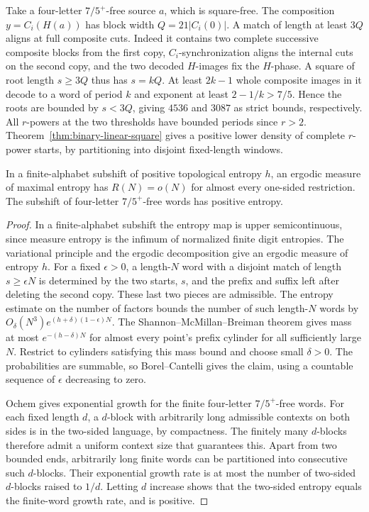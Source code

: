 Take a four-letter \(7/5^+\)-free source \(a\), which is square-free. The composition \(y=C_i(H(a))\) has block width \(Q=21|C_i(0)|\). A match of length at least \(3Q\) aligns at full composite cuts. Indeed it contains two complete successive composite blocks from the first copy, \(C_i\)-synchronization aligns the internal cuts on the second copy, and the two decoded \(H\)-images fix the \(H\)-phase. A square of root length \(s\ge3Q\) thus has \(s=kQ\). At least \(2k-1\) whole composite images in it decode to a word of period \(k\) and exponent at least \(2-1/k>7/5\). Hence the roots are bounded by \(s<3Q\), giving \(4536\) and \(3087\) as strict bounds, respectively. All \(r\)-powers at the two thresholds have bounded periods since \(r>2\). Theorem~\ref{thm:binary-linear-square} gives a positive lower density of complete \(r\)-power starts, by partitioning into disjoint fixed-length windows.

\begin{lemma}\label{lem:entropy-repetitions}
In a finite-alphabet subshift of positive topological entropy \(h\), an ergodic measure of maximal entropy has \(R(N)=o(N)\) for almost every one-sided restriction. The subshift of four-letter \(7/5^+\)-free words has positive entropy.
\end{lemma}
\begin{proof}
In a finite-alphabet subshift the entropy map is upper semicontinuous, since measure entropy is the infimum of normalized finite digit entropies. The variational principle and the ergodic decomposition give an ergodic measure of entropy \(h\). For a fixed \(\epsilon>0\), a length-\(N\) word with a disjoint match of length \(s\ge\epsilon N\) is determined by the two starts, \(s\), and the prefix and suffix left after deleting the second copy. These last two pieces are admissible. The entropy estimate on the number of factors bounds the number of such length-\(N\) words by \(O_\delta(N^3)e^{(h+\delta)(1-\epsilon)N}\). The Shannon--McMillan--Breiman theorem \cite{Breiman} gives mass at most \(e^{-(h-\delta)N}\) for almost every point's prefix cylinder for all sufficiently large \(N\). Restrict to cylinders satisfying this mass bound and choose small \(\delta>0\). The probabilities are summable, so Borel--Cantelli gives the claim, using a countable sequence of \(\epsilon\) decreasing to zero.

Ochem \cite[Theorem~4.2(2)]{OchemSource} gives exponential growth for the finite four-letter \(7/5^+\)-free words. For each fixed length \(d\), a \(d\)-block with arbitrarily long admissible contexts on both sides is in the two-sided language, by compactness. The finitely many \(d\)-blocks therefore admit a uniform context size that guarantees this. Apart from two bounded ends, arbitrarily long finite words can be partitioned into consecutive such \(d\)-blocks. Their exponential growth rate is at most the number of two-sided \(d\)-blocks raised to \(1/d\). Letting \(d\) increase shows that the two-sided entropy equals the finite-word growth rate, and is positive.
\end{proof}

